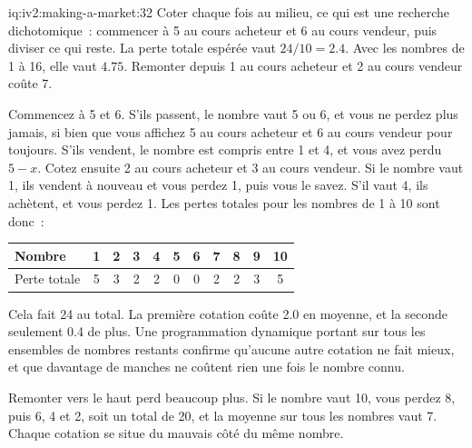 \begin{solution}{iq:iv2:making-a-market:32}
Coter chaque fois au milieu, ce qui est une recherche dichotomique~: commencer à 5 au cours acheteur et 6 au cours vendeur, puis diviser ce qui reste. La perte totale espérée vaut $24/10 = 2.4$. Avec les nombres de 1 à 16, elle vaut $4.75$. Remonter depuis 1 au cours acheteur et 2 au cours vendeur coûte 7.

Commencez à 5 et 6. S'ils passent, le nombre vaut 5 ou 6, et vous ne perdez plus jamais, si bien que vous affichez 5 au cours acheteur et 6 au cours vendeur pour toujours. S'ils vendent, le nombre est compris entre 1 et 4, et vous avez perdu $5 - x$. Cotez ensuite 2 au cours acheteur et 3 au cours vendeur. Si le nombre vaut 1, ils vendent à nouveau et vous perdez 1, puis vous le savez. S'il vaut 4, ils achètent, et vous perdez 1. Les pertes totales pour les nombres de 1 à 10 sont donc~:
\begin{center}\small
\begin{tabular}{@{}l*{10}{c}@{}}
Nombre & 1 & 2 & 3 & 4 & 5 & 6 & 7 & 8 & 9 & 10 \\ \hline
Perte totale & 5 & 3 & 2 & 2 & 0 & 0 & 2 & 2 & 3 & 5
\end{tabular}
\end{center}
Cela fait 24 au total. La première cotation coûte 2.0 en moyenne, et la seconde seulement 0.4 de plus. Une programmation dynamique portant sur tous les ensembles de nombres restants confirme qu'aucune autre cotation ne fait mieux, et que davantage de manches ne coûtent rien une fois le nombre connu.

Remonter vers le haut perd beaucoup plus. Si le nombre vaut 10, vous perdez 8, puis 6, 4 et 2, soit un total de 20, et la moyenne sur tous les nombres vaut 7. Chaque cotation se situe du mauvais côté du même nombre.

\end{solution}


